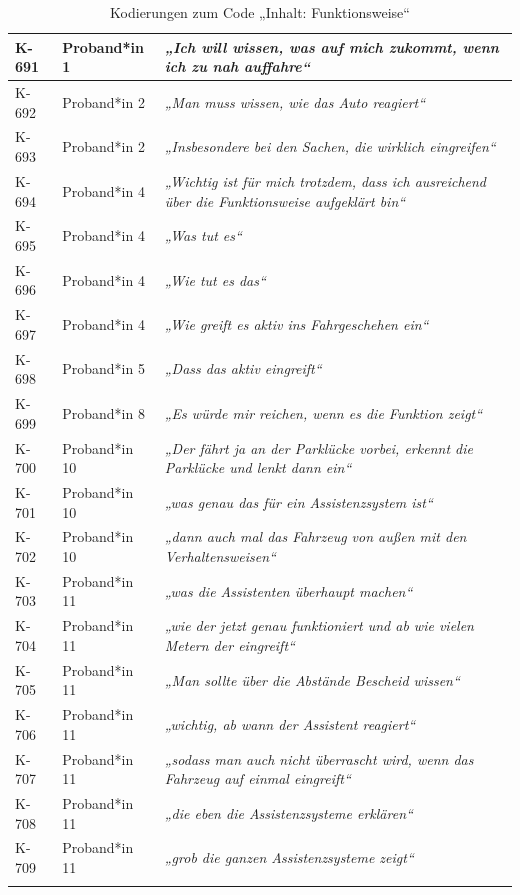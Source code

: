 {\begin{xltabular}{\textwidth}{
    |P{0.10\textwidth}
    |P{0.17\textwidth}
    |Y|
}
K-691 & Proband*in 1 & \textit{„Ich will wissen, was auf mich zukommt, wenn ich zu nah auffahre“} \\
\hline
K-692 & Proband*in 2 & \textit{„Man muss wissen, wie das Auto reagiert“} \\
\hline
K-693 & Proband*in 2 & \textit{„Insbesondere bei den Sachen, die wirklich eingreifen“} \\
\hline
K-694 & Proband*in 4 & \textit{„Wichtig ist für mich trotzdem, dass ich ausreichend über die Funktionsweise aufgeklärt bin“} \\
\hline
K-695 & Proband*in 4 & \textit{„Was tut es“} \\
\hline
K-696 & Proband*in 4 & \textit{„Wie tut es das“} \\
\hline
K-697 & Proband*in 4 & \textit{„Wie greift es aktiv ins Fahrgeschehen ein“} \\
\hline
K-698 & Proband*in 5 & \textit{„Dass das aktiv eingreift“} \\
\hline
K-699 & Proband*in 8 & \textit{„Es würde mir reichen, wenn es die Funktion zeigt“} \\
\hline
K-700 & Proband*in 10 & \textit{„Der fährt ja an der Parklücke vorbei, erkennt die Parklücke und lenkt dann ein“} \\
\hline
K-701 & Proband*in 10 & \textit{„was genau das für ein Assistenzsystem ist“} \\
\hline
K-702 & Proband*in 10 & \textit{„dann auch mal das Fahrzeug von außen mit den Verhaltensweisen“} \\
\hline
K-703 & Proband*in 11 & \textit{„was die Assistenten überhaupt machen“} \\
\hline
K-704 & Proband*in 11 & \textit{„wie der jetzt genau funktioniert und ab wie vielen Metern der eingreift“} \\
\hline
K-705 & Proband*in 11 & \textit{„Man sollte über die Abstände Bescheid wissen“} \\
\hline
K-706 & Proband*in 11 & \textit{„wichtig, ab wann der Assistent reagiert“} \\
\hline
K-707 & Proband*in 11 & \textit{„sodass man auch nicht überrascht wird, wenn das Fahrzeug auf einmal eingreift“} \\
\hline
K-708 & Proband*in 11 & \textit{„die eben die Assistenzsysteme erklären“} \\
\hline
K-709 & Proband*in 11 & \textit{„grob die ganzen Assistenzsysteme zeigt“} \\
\hline
\caption{Kodierungen zum Code „Inhalt: Funktionsweise“}\label{tab:kodiernachweis-inhalt-funktionsweise}\\
\end{xltabular}
}

